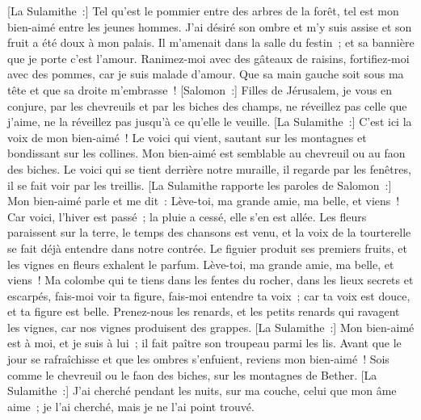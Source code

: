 \begin{multicols}{2}
[La Sulamithe~:] Tel qu'est le pommier entre des arbres de la forêt, tel est mon bien-aimé entre les jeunes hommes. J'ai désiré son ombre et m'y suis assise et son fruit a été doux à mon palais.
Il m'amenait dans la salle du festin~; et sa bannière que je porte c'est l'amour.
 Ranimez-moi avec des gâteaux de raisins, fortifiez-moi avec des pommes, car je suis malade d'amour.
Que sa main gauche soit sous ma tête et que sa droite m'embrasse~!
[Salomon~:] Filles de Jérusalem, je vous en conjure, par les chevreuils et par les biches des champs, ne réveillez pas celle que j'aime, ne la réveillez pas jusqu'à ce qu'elle le veuille.
[La Sulamithe~:] C'est ici la voix de mon bien-aimé~! Le voici qui vient, sautant sur les montagnes et bondissant sur les collines.
Mon bien-aimé est semblable au chevreuil ou au faon des biches. Le voici qui se tient derrière notre muraille, il regarde par les fenêtres, il se fait voir par les treillis.
[La Sulamithe rapporte les paroles de Salomon~:] Mon bien-aimé parle et me dit~: Lève-toi, ma grande amie, ma belle, et viens~!
Car voici, l'hiver est passé~; la pluie a cessé, elle s'en est allée.
Les fleurs paraissent sur la terre, le temps des chansons est venu, et la voix de la tourterelle se fait déjà entendre dans notre contrée.
Le figuier produit ses premiers fruits, et les vignes en fleurs exhalent le parfum. Lève-toi, ma grande amie, ma belle, et viens~!
Ma colombe qui te tiens dans les fentes du rocher, dans les lieux secrets et escarpés, fais-moi voir ta figure, fais-moi entendre ta voix~; car ta voix est douce, et ta figure est belle.
Prenez-nous les renards, et les petits renards qui ravagent les vignes, car nos vignes produisent des grappes.
[La Sulamithe~:] Mon bien-aimé est à moi, et je suis à lui~; il fait paître son troupeau parmi les lis.
Avant que le jour se rafraîchisse et que les ombres s'enfuient, reviens mon bien-aimé~! Sois comme le chevreuil ou le faon des biches, sur les montagnes de Bether.
\VerseOne{}[La Sulamithe~:] J'ai cherché pendant les nuits, sur ma couche, celui que mon âme aime~; je l'ai cherché, mais je ne l'ai point trouvé.

\end{multicols}
